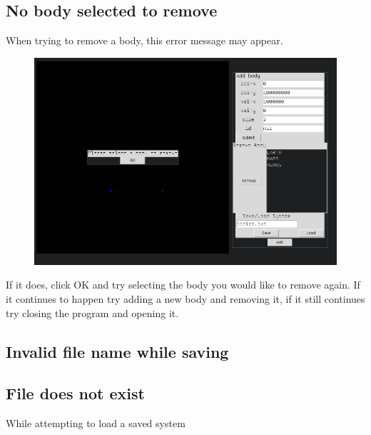 \documentclass[a4paper,11pt,titlepage]{article}
\begin{document}
\subsection{No body selected to remove}
When trying to remove a body, this error message may appear.
\begin{figure}[H]
	\includegraphics[width=\textwidth]{../img/rm3.png}
\end{figure}

If it does, click OK and try selecting the body you would like to remove again.
If it continues to happen try adding a new body and removing it, if it still
continues try closing the program and opening it.

\subsection{Invalid file name while saving}

\subsection{File does not exist}
While attempting to load a saved system
\end{document}
